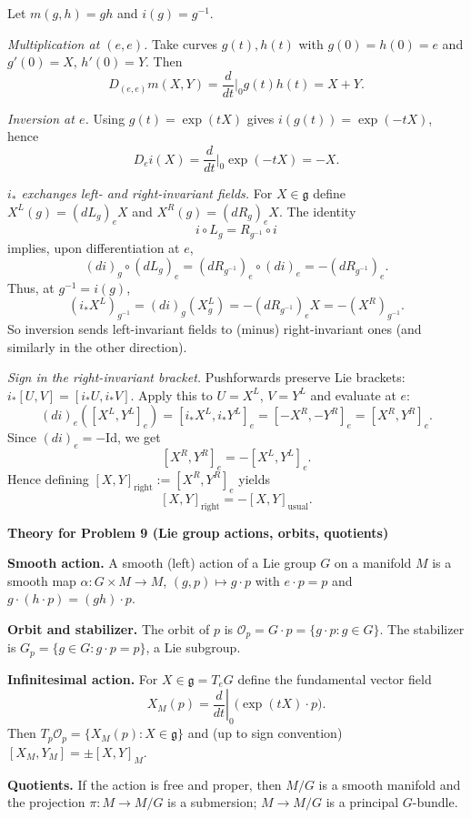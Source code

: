 \begin{solution}
Let $m(g,h)=gh$ and $i(g)=g^{-1}$.

\emph{Multiplication at $(e,e)$.}
Take curves $g(t),h(t)$ with $g(0)=h(0)=e$ and $g'(0)=X$, $h'(0)=Y$. Then
\[
D_{(e,e)}m(X,Y)=\frac{d}{dt}\Big|_{0}g(t)h(t)=X+Y.
\]

\emph{Inversion at $e$.}
Using $g(t)=\exp(tX)$ gives $i(g(t))=\exp(-tX)$, hence
\[
D_e i(X)=\frac{d}{dt}\Big|_{0}\exp(-tX)=-X.
\]

\emph{$i_*$ exchanges left- and right-invariant fields.}
For $X\in\mathfrak g$ define $X^L(g)=(dL_g)_eX$ and $X^R(g)=(dR_g)_eX$.
The identity
\[
i\circ L_g = R_{g^{-1}}\circ i
\]
implies, upon differentiation at $e$,
\[
(d i)_g\circ(dL_g)_e=(dR_{g^{-1}})_e\circ(d i)_e=-(dR_{g^{-1}})_e.
\]
Thus, at $g^{-1}=i(g)$,
\[
(i_*X^L)_{g^{-1}}=(d i)_g(X^L_g)=-(dR_{g^{-1}})_eX=-(X^R)_{g^{-1}}.
\]
So inversion sends left-invariant fields to (minus) right-invariant ones (and similarly in the other direction).

\emph{Sign in the right-invariant bracket.}
Pushforwards preserve Lie brackets: $i_*[U,V]=[i_*U,i_*V]$. Apply this to $U=X^L$, $V=Y^L$ and evaluate at $e$:
\[
(d i)_e([X^L,Y^L]_e)=[i_*X^L,i_*Y^L]_e=[-X^R,-Y^R]_e=[X^R,Y^R]_e.
\]
Since $(d i)_e=-\mathrm{Id}$, we get
\[
[X^R,Y^R]_e=-[X^L,Y^L]_e.
\]
Hence defining $[X,Y]_{\mathrm{right}}:=[X^R,Y^R]_e$ yields
\[
[X,Y]_{\mathrm{right}}=-[X,Y]_{\mathrm{usual}}.
\]

\par\medskip\noindent\textbf{Theory for Problem 9 (Lie group actions, orbits, quotients)}\par\smallskip


\textbf{Smooth action.}
A smooth (left) action of a Lie group $G$ on a manifold $M$ is a smooth map
$\alpha:G\times M\to M$, $(g,p)\mapsto g\cdot p$ with $e\cdot p=p$ and
$g\cdot(h\cdot p)=(gh)\cdot p$.

\textbf{Orbit and stabilizer.}
The orbit of $p$ is $\mathcal O_p=G\cdot p=\{g\cdot p:g\in G\}$.
The stabilizer is $G_p=\{g\in G:g\cdot p=p\}$, a Lie subgroup.

\textbf{Infinitesimal action.}
For $X\in\mathfrak g=T_eG$ define the fundamental vector field
\[
X_M(p)=\left.\frac{d}{dt}\right|_0 \big(\exp(tX)\cdot p\big).
\]
Then $T_p\mathcal O_p=\{X_M(p):X\in\mathfrak g\}$ and (up to sign convention)
$[X_M,Y_M]=\pm [X,Y]_M$.

\textbf{Quotients.}
If the action is free and proper, then $M/G$ is a smooth manifold and the projection
$\pi:M\to M/G$ is a submersion; $M\to M/G$ is a principal $G$-bundle.
\end{solution}

